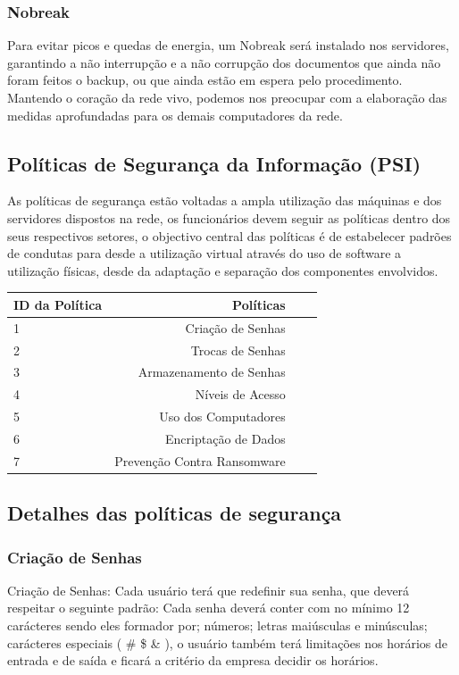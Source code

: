 \documentclass[12pt]{article}
\begin{document}
\subsubsection{Nobreak}
Para evitar picos e quedas de energia, um Nobreak será instalado nos servidores, garantindo a não interrupção e a não corrupção dos documentos que ainda não foram feitos o backup, ou que ainda estão em espera pelo procedimento. Mantendo o coração da rede vivo, podemos nos preocupar com a elaboração das medidas aprofundadas para os demais computadores da rede.

\subsection{Políticas de Segurança da Informação (PSI)}
As políticas de segurança estão voltadas a ampla utilização das máquinas e dos servidores dispostos na rede, os funcionários devem seguir as políticas dentro dos seus respectivos setores, o objectivo central das políticas é de estabelecer padrões de condutas para desde a utilização virtual através do uso de software a utilização físicas, desde da adaptação e separação dos componentes envolvidos.

\begin{center}
\begin{tabular}{| l | r | r | r |}
\hline 
ID da Política & Políticas\\
\hline
1 & Criação de Senhas\\
2 & Trocas de Senhas\\
3 & Armazenamento de Senhas\\
4 & Níveis de Acesso\\
5 & Uso dos Computadores\\
6 & Encriptação de Dados\\
7 & Prevenção Contra Ransomware\\
\hline
\end{tabular}
\end{center}

\subsection{Detalhes das políticas de segurança}

\subsubsection{Criação de Senhas}
Criação de Senhas: Cada usuário terá que redefinir sua senha, que deverá respeitar o seguinte padrão: Cada senha deverá conter com no mínimo 12 carácteres sendo eles formador por; números; letras maiúsculas e minúsculas; carácteres especiais ( \@ \# \$ \& ), o usuário também terá limitações nos horários de entrada e de saída e ficará a critério da empresa decidir os horários.
\end{document}
